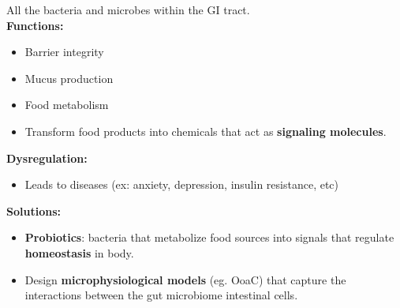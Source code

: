 All the bacteria and microbes within the GI tract.\\
\textbf{Functions:}
\begin{itemize}
    \item Barrier integrity
    \item Mucus production
    \item Food metabolism
    \item Transform food products into chemicals that act as \textbf{signaling molecules}.
\end{itemize}
\textbf{Dysregulation:}\\
\begin{itemize}
    \item Leads to diseases (ex: anxiety, depression, insulin resistance, etc)
\end{itemize}
\textbf{Solutions:}
\begin{itemize}
    \item \textbf{Probiotics}: bacteria that metabolize food
        sources into signals that regulate
        \textbf{homeostasis} in body.
    \item Design \textbf{microphysiological models} (eg. OoaC) that
        capture the interactions between the gut
        microbiome intestinal cells.
\end{itemize}

